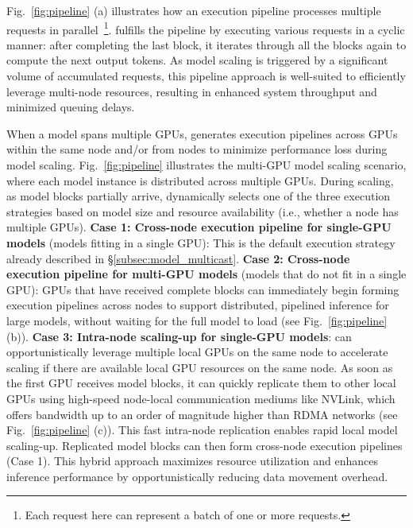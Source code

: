 Fig.~\ref{fig:pipeline} (a) illustrates how an execution pipeline processes multiple requests in parallel~\footnote{Each request here can represent a batch of one or more requests.}.
\AlgoName fulfills the pipeline by executing various requests in a cyclic manner: after completing the last block, it iterates through all the blocks again to compute the next output tokens.
As model scaling is triggered by a significant volume of accumulated requests, this pipeline approach is well-suited to efficiently leverage multi-node resources, resulting in enhanced system throughput and minimized queuing delays.
\fi 

When a model spans multiple GPUs, \AlgoName generates execution pipelines across GPUs within the same node and/or from nodes to minimize performance loss during model scaling. 
Fig.~\ref{fig:pipeline} illustrates the multi-GPU model scaling scenario, where each model instance is distributed across multiple GPUs. During scaling, as model blocks partially arrive, \AlgoName dynamically selects one of the three execution strategies based on model size and resource availability (i.e., whether a node has multiple GPUs). 
{\bf Case 1: Cross-node execution pipeline for single-GPU models} (models fitting in a single GPU): This is the default execution strategy already described in \S\ref{subsec:model_multicast}.
{\bf Case 2: Cross-node execution pipeline for multi-GPU models} (models that do not fit in a single GPU): GPUs that have received complete blocks can immediately begin forming execution pipelines across nodes to support distributed, pipelined inference for large models, without waiting for the full model to load (see Fig.~\ref{fig:pipeline} (b)). 
{\bf Case 3: Intra-node scaling-up for single-GPU models}: \AlgoName can opportunistically leverage multiple local GPUs on the same node to accelerate scaling if there are available local GPU resources on the same node. As soon as the first GPU receives model blocks, it can quickly replicate them to other local GPUs using high-speed node-local communication mediums like NVLink, which offers bandwidth up to an order of magnitude higher than RDMA networks (see Fig.~\ref{fig:pipeline} (c)). This fast intra-node replication enables rapid local model scaling-up. Replicated model blocks can then form cross-node execution pipelines (Case 1).   
This hybrid approach maximizes resource utilization and enhances inference performance by opportunistically reducing data movement overhead. 

